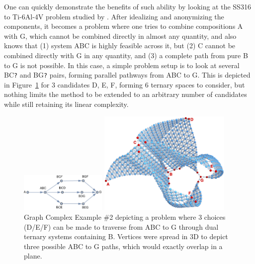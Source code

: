 One can quickly demonstrate the benefits of such ability by looking at the SS316 to Ti-6Al-4V problem studied by \citet{Bobbio2022DesignCompositions}. After idealizing and anonymizing the components, it becomes a problem where one tries to combine compositions A with G, which cannot be combined directly in almost any quantity, and also knows that (1) system ABC is highly feasible across it, but (2) C cannot be combined directly with G in any quantity, and (3) a complete path from pure B to G is not possible. In this case, a simple problem setup is to look at several BC\texttt{?} and BG\texttt{?} pairs, forming parallel pathways from ABC to G. This is depicted in Figure~\ref{nimplex:fig:graphcomplex2} for 3 candidates D, E, F, forming 6 ternary spaces to consider, but nothing limits the method to be extended to an arbitrary number of candidates while still retaining its linear complexity.

\begin{figure}[h]
    \centering
    \begin{adjustbox}{valign=c}
        \includegraphics[width=0.37\textwidth]{nimplex/GraphComplexMap2.png}
    \end{adjustbox}
    \hspace{6pt}
    \begin{adjustbox}{valign=c}
        \includegraphics[width=0.57\textwidth]{nimplex/GraphComplex2.png}
    \end{adjustbox}
    \caption{Graph Complex Example \#2 depicting a problem where 3 choices (D/E/F) can be made to traverse from ABC to G through dual ternary systems containing B. Vertices were spread in 3D to depict three possible ABC to G paths, which would exactly overlap in a plane.} 
    \label{nimplex:fig:graphcomplex2}
\end{figure}

